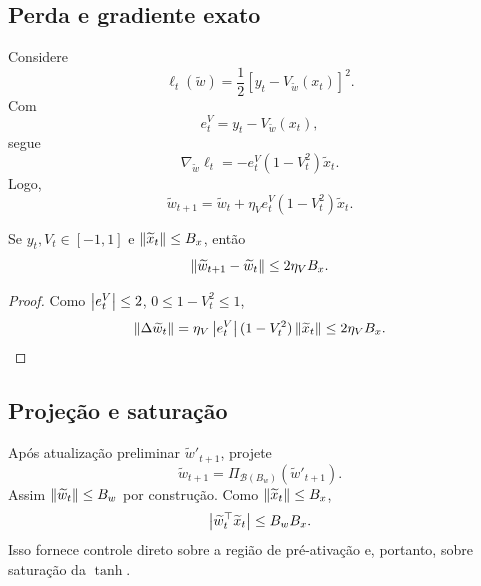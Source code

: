 \subsection{Perda e gradiente exato}

Considere
\begin{equation}
\ell_t(\widetilde w)=\frac12[y_t-V_{\widetilde w}(x_t)]^2.
\end{equation}
Com
\begin{equation}
e_t^V=y_t-V_{\widetilde w}(x_t),
\end{equation}
segue
\begin{equation}
\nabla_{\widetilde w}\ell_t
=-e_t^V(1-V_t^2)\widetilde x_t.
\end{equation}
Logo,
\begin{equation}
\widetilde w_{t+1}
=\widetilde w_t
+\eta_V e_t^V(1-V_t^2)\widetilde x_t.
\label{eq:exact_tanh_update}
\end{equation}

\begin{proposition}
Se \(y_t,V_t\in[-1,1]\) e \(\left\lVert \widetilde x_t \right\rVert\le B_x\), então
\begin{equation}
\left\lVert \widetilde w_{t+1}-\widetilde w_t \right\rVert
\le 2\eta_V B_x.
\end{equation}
\end{proposition}
\begin{proof}
Como \(\left\lvert e_t^V \right\rvert\le2\), \(0\le1-V_t^2\le1\),
\[
\left\lVert \Delta\widetilde w_t \right\rVert
=\eta_V\left\lvert e_t^V \right\rvert(1-V_t^2)\left\lVert \widetilde x_t \right\rVert
\le2\eta_VB_x.
\]
\end{proof}

\subsection{Projeção e saturação}

Após atualização preliminar \(\widetilde w'_{t+1}\), projete
\begin{equation}
\widetilde w_{t+1}
=\Pi_{\mathcal B(B_w)}(\widetilde w'_{t+1}).
\end{equation}
Assim \(\left\lVert \widetilde w_t \right\rVert\le B_w\) por construção. Como \(\left\lVert \widetilde x_t \right\rVert\le B_x\),
\begin{equation}
\left\lvert \widetilde w_t^\top\widetilde x_t \right\rvert
\le B_wB_x.
\end{equation}
Isso fornece controle direto sobre a região de pré-ativação e, portanto, sobre saturação da \(\tanh\).

